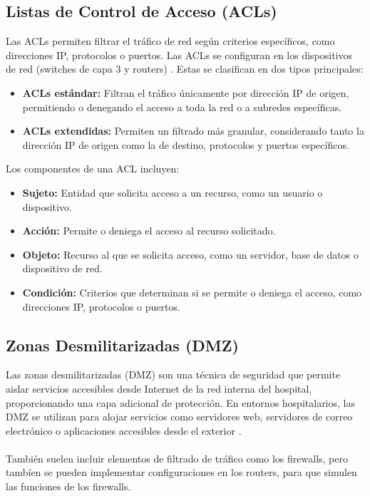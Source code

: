 \subsection{Listas de Control de Acceso (ACLs)}
\label{subsec:acl}
Las ACLs permiten filtrar el tráfico de red según criterios específicos, como direcciones IP, protocolos o puertos. Las ACLs se configuran en los dispositivos de red (switches de capa 3 y routers) \cite{cisco-hospital-design}. Estas se 
clasifican en dos tipos principales:

\begin{itemize}
    \item \textbf{ACLs estándar:} Filtran el tráfico únicamente por dirección IP de origen, permitiendo o denegando el acceso a toda la red o a subredes específicas.
    \item \textbf{ACLs extendidas:} Permiten un filtrado más granular, considerando tanto la dirección IP de origen como la de destino, protocolos y puertos específicos.
\end{itemize}

Los componentes de una ACL incluyen:
\begin{itemize}
    \item \textbf{Sujeto:} Entidad que solicita acceso a un recurso, como un usuario o dispositivo.
    \item \textbf{Acción:} Permite o deniega el acceso al recurso solicitado.
    \item \textbf{Objeto:} Recurso al que se solicita acceso, como un servidor, base de datos o dispositivo de red.
    \item \textbf{Condición:} Criterios que determinan si se permite o deniega el acceso, como direcciones IP, protocolos o puertos.
\end{itemize}

\subsection{Zonas Desmilitarizadas (DMZ)}
Las zonas desmilitarizadas (DMZ) son una técnica de seguridad que permite aislar servicios accesibles desde Internet de la red interna del hospital, proporcionando una capa adicional de protección.
En entornos hospitalarios, las DMZ se utilizan para alojar servicios como servidores web, servidores de correo electrónico o aplicaciones accesibles desde el exterior \cite{dmz}.
\\ \\
También suelen incluir elementos de filtrado de tráfico como los firewalls, pero tambíen se pueden implementar configuraciones en los routers, para que simulen las funciones de los firewalls.

